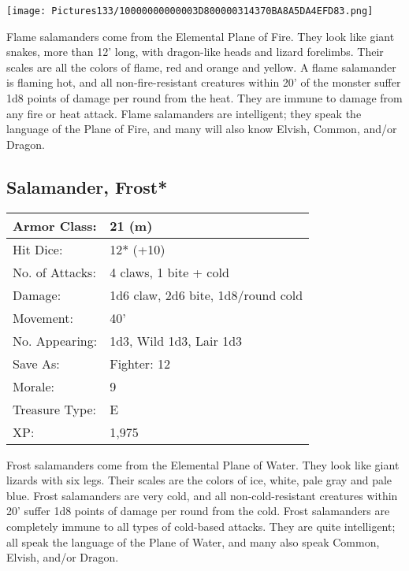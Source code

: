\documentclass[a4paper,twoside,openany,10pt]{book}
\begin{document}
\begin{multicols}{2}
\begin{center} \texttt{[image: Pictures133/10000000000003D800000314370BA8A5DA4EFD83.png]} \end{center}

Flame salamanders come from the Elemental Plane of Fire. They look like giant snakes, more than 12' long, with dragon-like heads and lizard forelimbs. Their scales are all the colors of flame, red and orange and yellow. A flame salamander is flaming hot, and all non-fire-resistant creatures within 20' of the monster suffer 1d8 points of damage per round from the heat. They are immune to damage from any fire or heat attack. Flame salamanders are intelligent; they speak the language of the Plane of Fire, and many will also know Elvish, Common, and/or Dragon.


\subsection*{Salamander, Frost*}\label{salamander-frost}

\begin{tabularx}{0.50\textwidth}{@{}lX@{}}
Armor Class: & 21 (m) \\\hline
Hit Dice: & 12* (+10) \\\hline
No. of Attacks: & 4 claws, 1 bite + cold \\\hline
Damage: & 1d6 claw, 2d6 bite, 1d8/round cold \\\hline
Movement: & 40' \\\hline
No. Appearing: & 1d3, Wild 1d3, Lair 1d3 \\\hline
Save As: & Fighter: 12 \\\hline
Morale: & 9 \\\hline
Treasure Type: & E \\\hline
XP: & 1,975 \\\hline
\end{tabularx}\medskip

Frost salamanders come from the Elemental Plane of Water. They look like giant lizards with six legs. Their scales are the colors of ice, white, pale gray and pale blue. Frost salamanders are very cold, and all non-cold-resistant creatures within 20' suffer 1d8 points of damage per round from the cold. Frost salamanders are completely immune to all types of cold-based attacks. They are quite intelligent; all speak the language of the Plane of Water, and many also speak Common, Elvish, and/or Dragon.


\end{multicols}
\end{document}
